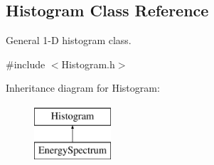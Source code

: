 \hypertarget{classHistogram}{
\subsection{Histogram Class Reference}
\label{classHistogram}
}


General 1-\/D histogram class.  




{\ttfamily \#include $<$Histogram.h$>$}

Inheritance diagram for Histogram:\begin{figure}[H]
\begin{center}
\leavevmode
\includegraphics[height=2.000000cm]{classHistogram}
\end{center}
\end{figure}
